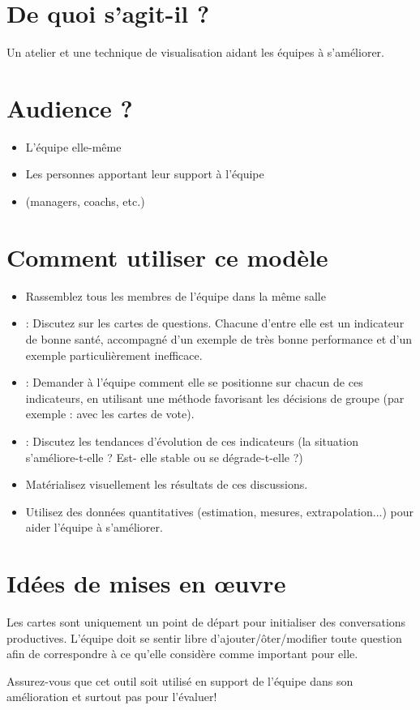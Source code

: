\documentclass[10pt]{article}
\newcommand*\circled[1]{
  \tikz[baseline=(char.base)]{
    \node[shape=circle,draw,fill=white,inner sep=2pt ] (char) {#1};}}
\begin{document}
\begin{minipage}{0.6\linewidth}
\section*{De  quoi  s’agit-il ?}
Un  atelier et  une technique de  visualisation  aidant  les équipes à s’améliorer.

\section*{Audience  ?}
\begin{itemize}
  \item L’équipe  elle-même 
  \item Les personnes apportant leur  support à l’équipe
  \item (managers,  coachs, etc.) 
\end{itemize}


\section*{Comment utiliser  ce  modèle}
\begin{itemize}
  \item Rassemblez  tous  les membres de  l’équipe  dans  la  même  salle 
  \item \circled{1} : Discutez  sur les cartes  de  questions. Chacune d’entre elle  est un  indicateur  de  bonne santé,  accompagné  d’un  exemple de  très  bonne performance et  d’un  exemple particulièrement  inefficace. 
  \item \circled{2} : Demander  à l’équipe  comment elle  se  positionne sur chacun  de  ces indicateurs,  en  utilisant une méthode favorisant  les décisions de  groupe  (par  exemple : avec  les cartes  de  vote).  
  \item \circled{3} : Discutez  les tendances d’évolution de  ces indicateurs (la situation s’améliore-t-elle ? Est- elle  stable  ou  se  dégrade-t-elle  ?)
  \item Matérialisez  visuellement  les résultats de  ces discussions.  
  \item Utilisez des données quantitatives (estimation,  mesures,  extrapolation...)  pour  aider l’équipe  à s’améliorer.  
\end{itemize}


\section*{Idées de  mises en  œuvre}
  Les cartes  sont  uniquement  un  point de  départ  pour  initialiser des conversations productives. L’équipe  doit  se  sentir libre d’ajouter/ôter/modifier toute question afin  de  correspondre  à ce  qu’elle considère comme important pour  elle.

  Assurez-vous  que cet outil  soit  utilisé  en  support de  l’équipe  dans  son amélioration  et  surtout pas pour  l’évaluer!
\end{minipage} \hfill
\end{document}
